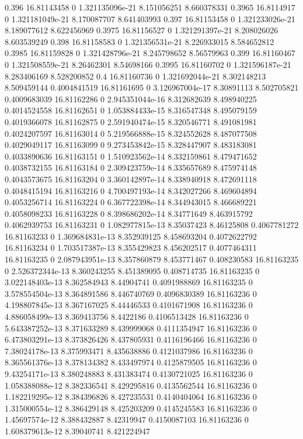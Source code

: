{0.396 16.81143458 0 1.321135096e-21 8.151056251 8.660378331
0.3965 16.8114917 0 1.321181049e-21 8.170087707 8.641403993
0.397 16.81153458 0 1.321233026e-21 8.189077612 8.622456969
0.3975 16.81156527 0 1.321291397e-21 8.208026026 8.603539249
0.398 16.81158583 0 1.321356531e-21 8.226933015 8.584652812
0.3985 16.81159828 0 1.321428796e-21 8.245798652 8.56579963
0.399 16.81160467 0 1.321508559e-21 8.26462301 8.54698166
0.3995 16.81160702 0 1.321596187e-21 8.283406169 8.528200852
0.4 16.81160736 0 1.321692044e-21 8.302148213 8.509459144
0.4004841519 16.81161695 0 3.126967004e-17 8.30891113 8.502705821
0.4009683039 16.81162286 0 2.945351044e-16 8.312682639 8.498940225
0.4014524558 16.81162651 0 1.053884433e-15 8.316547348 8.495079159
0.4019366078 16.81162875 0 2.591940474e-15 8.320546771 8.491081981
0.4024207597 16.81163014 0 5.219566888e-15 8.324552628 8.487077508
0.4029049117 16.81163099 0 9.273453842e-15 8.328447907 8.483183081
0.4033890636 16.81163151 0 1.510923562e-14 8.332159861 8.479471652
0.4038732155 16.81163184 0 2.309423759e-14 8.335657689 8.475974148
0.4043573675 16.81163204 0 3.360142897e-14 8.338940918 8.472691118
0.4048415194 16.81163216 0 4.700497193e-14 8.342027266 8.469604894
0.4053256714 16.81163224 0 6.367722398e-14 8.344943015 8.466689221
0.4058098233 16.81163228 0 8.398686202e-14 8.34771649 8.463915792
0.4062939753 16.81163231 0 1.082977815e-13 8.35037423 8.46125808
0.4067781272 16.81163233 0 1.369684831e-13 8.352939125 8.458693204
0.4072622792 16.81163234 0 1.703517387e-13 8.355429823 8.456202517
0.4077464311 16.81163235 0 2.087943951e-13 8.357860879 8.453771467
0.408230583 16.81163235 0 2.526372344e-13 8.360243255 8.451389095
0.408714735 16.81163235 0 3.022148403e-13 8.362584943 8.44904741
0.4091988869 16.81163235 0 3.578554504e-13 8.364891586 8.446740769
0.4096830389 16.81163236 0 4.198807845e-13 8.367167025 8.44446533
0.4101671908 16.81163236 0 4.886058499e-13 8.369413756 8.4422186
0.4106513428 16.81163236 0 5.643387252e-13 8.371633289 8.439999068
0.4111354947 16.81163236 0 6.473803291e-13 8.373826426 8.437805931
0.4116196466 16.81163236 0 7.38024178e-13 8.375993471 8.435638886
0.4121037986 16.81163236 0 8.365561376e-13 8.378134382 8.433497974
0.4125879505 16.81163236 0 9.43254171e-13 8.380248883 8.431383474
0.4130721025 16.81163236 0 1.058388088e-12 8.382336541 8.429295816
0.4135562544 16.81163236 0 1.182219295e-12 8.384396826 8.427235531
0.4140404064 16.81163236 0 1.315000554e-12 8.386429148 8.425203209
0.4145245583 16.81163236 0 1.45697574e-12 8.388432887 8.42319947
0.4150087103 16.81163236 0 1.608379613e-12 8.39040741 8.421224947
}
